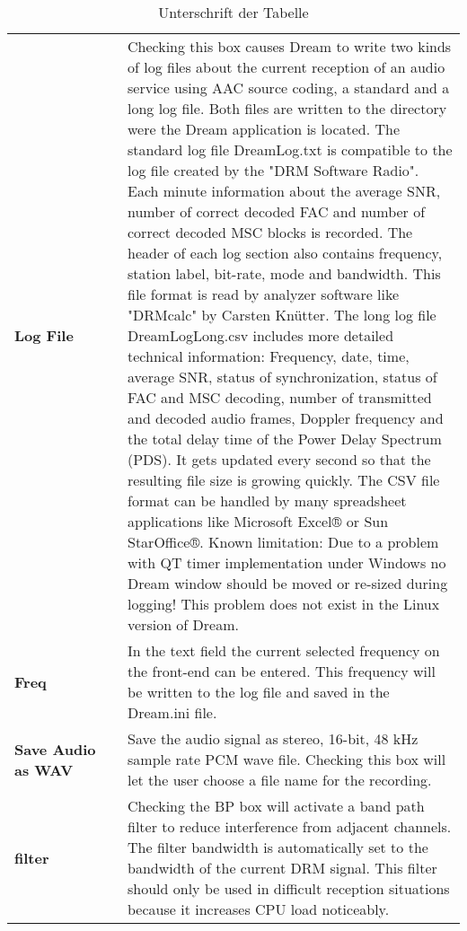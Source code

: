 \begin{table}[htb]
\begin{center}
\begin{tabular}{p{0.25\linewidth} | p{0.75\linewidth}}
			\textbf{Log File} & Checking this box causes Dream to write two kinds of log files about the current reception of an audio service using AAC source coding, a standard and a long log file. Both files are written to the directory were the Dream application is located.
			The standard log file DreamLog.txt is compatible to the log file created by the "DRM Software Radio". Each minute information about the average SNR, number of correct decoded FAC and number of correct decoded MSC blocks is recorded. The header of each log section also contains frequency, station label, bit-rate, mode and bandwidth. This file format is read by analyzer software like "DRMcalc" by Carsten Knütter.
			The long log file DreamLogLong.csv includes more detailed technical information: Frequency, date, time, average SNR, status of synchronization, status of FAC and MSC decoding, number of transmitted and decoded audio frames, Doppler frequency and the total delay time of the Power Delay Spectrum (PDS). It gets updated every second so that the resulting file size is growing quickly. The CSV file format can be handled by many spreadsheet applications like Microsoft Excel® or Sun StarOffice®.
			Known limitation: Due to a problem with QT timer implementation under Windows no Dream window should be moved or re-sized during logging! This problem does not exist in the Linux version of Dream.\\
			
			\textbf{Freq} & In the text field the current selected frequency on the front-end can be entered. This frequency will be written to the log file and saved in the Dream.ini file.
			\\
			
			\textbf{Save Audio as WAV} & Save the audio signal as stereo, 16-bit, 48 kHz sample rate PCM wave file. Checking this box will let the user choose a file name for the recording. \\
			
			\textbf{filter}& Checking the BP box will activate a band path filter to reduce interference from adjacent channels. The filter bandwidth is automatically set to the bandwidth of the current DRM signal.
			This filter should only be used in difficult reception situations because it increases CPU load noticeably.\\
			\hline
		\end{tabular}
		\caption{Unterschrift  der Tabelle}
		\label{tab:Tabelle1}
	\end{center}
\end{table}

